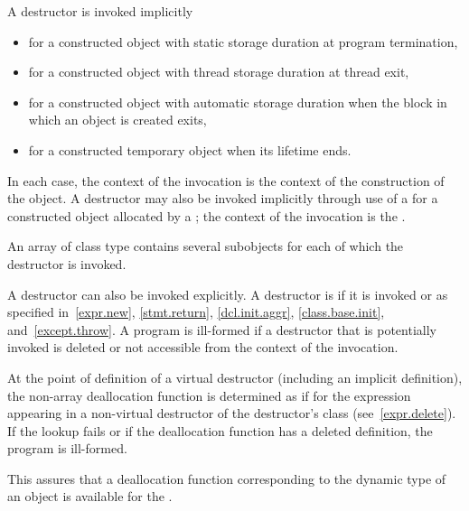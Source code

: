 \pnum
{}%
%
A destructor is invoked implicitly
\begin{itemize}
\item for a constructed object with static storage duration at program termination,

\item for a constructed object with thread storage duration at thread exit,

\item for a constructed object with automatic storage duration when the block in which an object is created exits,

\item for a constructed temporary object when its lifetime ends.
\end{itemize}

%
%
In each case, the context of the invocation is the context of the construction of
the object. A destructor may also be invoked implicitly through use of a
 for a constructed object allocated
by a ; the context of the invocation is the
.
\begin{note}
An array of class type contains several subobjects for each of which
the destructor is invoked.
\end{note}
A destructor can also be invoked explicitly. A destructor is 
if it is invoked or as specified in~\ref{expr.new},
\ref{stmt.return}, \ref{dcl.init.aggr},
\ref{class.base.init}, and~\ref{except.throw}.
A program is ill-formed if a destructor that is potentially invoked is deleted
or not accessible from the context of the invocation.

\pnum
At the point of definition of a virtual destructor (including an implicit
definition), the non-array deallocation function is
determined as if for the expression  appearing in a
non-virtual destructor of the destructor's class (see~\ref{expr.delete}).
If the lookup fails or if the deallocation function has
a deleted definition, the program is ill-formed.
\begin{note}
This assures that a deallocation function corresponding to the dynamic type of an
object is available for the
.
\end{note}

